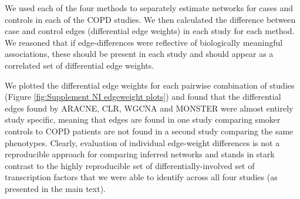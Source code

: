We used each of the four methods to separately estimate networks for cases and controls in each of the COPD studies. We then calculated the difference between case and control edges (differential edge weights) in each study for each method. We reasoned that if edge-differences were reflective of biologically meaningful associations, these should be present in each study and should appear as a correlated set of differential edge weights.

We plotted the differential edge weights for each pairwise combination of studies (Figure \ref{fig:Supplement NI edgeweight plots}) and found that the differential edges found by ARACNE, CLR, WGCNA and MONSTER were almost entirely study specific, meaning that edges are found in one study comparing smoker controls to COPD patients are not found in a second study comparing the same phenotypes. Clearly, evaluation of individual edge-weight differences is not a reproducible approach for comparing inferred networks and stands in stark contrast to the highly reproducible set of differentially-involved set of transcription factors that we were able to identify across all four studies (as presented in the main text).


